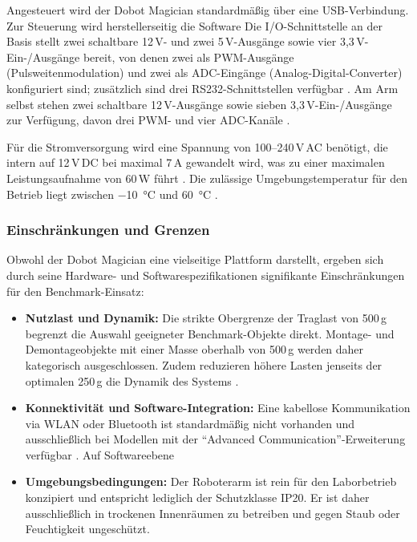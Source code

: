 \documentclass[12pt]{article}
\begin{document}
Angesteuert wird der Dobot Magician standardmäßig über eine USB-Verbindung. Zur Steuerung wird herstellerseitig die Software 
Die I/O-Schnittstelle an der Basis stellt zwei schaltbare 12\,V- und zwei 5\,V-Ausgänge sowie vier 3,3\,V-Ein-/Ausgänge bereit, von denen zwei als PWM-Ausgänge (Pulsweitenmodulation) und zwei als ADC-Eingänge (Analog-Digital-Converter) konfiguriert sind; zusätzlich sind drei RS232-Schnittstellen verfügbar \cite{dobot_datasheet}. Am Arm selbst stehen zwei schaltbare 12\,V-Ausgänge sowie sieben 3,3\,V-Ein-/Ausgänge zur Verfügung, davon drei PWM- und vier ADC-Kanäle \cite{dobot_datasheet}.

Für die Stromversorgung wird eine Spannung von 100–240\,V\,AC benötigt, die intern auf 12\,V\,DC bei maximal 7\,A gewandelt wird, was zu einer maximalen Leistungsaufnahme von 60\,W führt \cite{dobot_datasheet}. Die zulässige Umgebungstemperatur für den Betrieb liegt zwischen \SI{-10}{\degreeCelsius} und \SI{60}{\degreeCelsius} \cite{dobot_datasheet}.


\subsubsection{Einschränkungen und Grenzen}
\label{sec:dobot-einschraenkungen}
Obwohl der Dobot Magician eine vielseitige Plattform darstellt, ergeben sich durch seine Hardware- und Softwarespezifikationen signifikante Einschränkungen für den Benchmark-Einsatz:

\begin{itemize}
    \item \textbf{Nutzlast und Dynamik:} Die strikte Obergrenze der Traglast von 500\,g begrenzt die Auswahl geeigneter Benchmark-Objekte direkt. Montage- und Demontageobjekte mit einer Masse oberhalb von 500\,g werden daher kategorisch ausgeschlossen. Zudem reduzieren höhere Lasten jenseits der optimalen 250\,g die Dynamik des Systems \cite{dobot_datasheet}.
    \item \textbf{Konnektivität und Software-Integration:} Eine kabellose Kommunikation via WLAN oder Bluetooth ist standardmäßig nicht vorhanden und ausschließlich bei Modellen mit der \enquote{Advanced Communication}-Erweiterung verfügbar \cite{dobot_datasheet}. Auf Softwareebene 
    \item \textbf{Umgebungsbedingungen:} Der Roboterarm ist rein für den Laborbetrieb konzipiert und entspricht lediglich der Schutzklasse IP20. Er ist daher ausschließlich in trockenen Innenräumen zu betreiben \cite{dobot_datasheet} und gegen Staub oder Feuchtigkeit ungeschützt.
\end{itemize}
\end{document}
